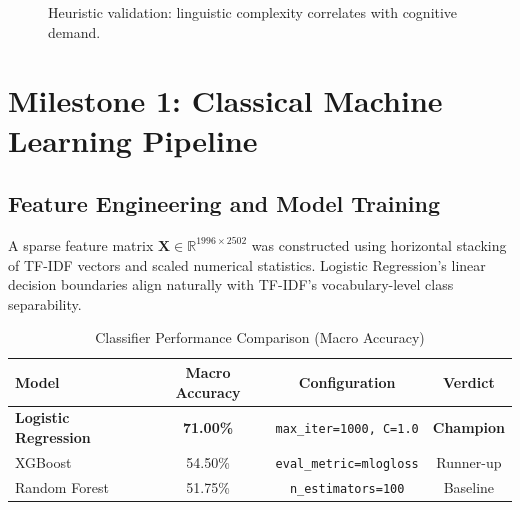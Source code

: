 \documentclass[12pt,a4paper]{article}
\begin{document}
\begin{figure}[H]
\centering
{}
\caption{Heuristic validation: linguistic complexity correlates with cognitive demand.}
\label{fig:wordcount}
\end{figure}

\section{Milestone 1: Classical Machine Learning Pipeline}

\subsection{Feature Engineering and Model Training}

A sparse feature matrix $\mathbf{X} \in \mathbb{R}^{1996 \times 2502}$ was constructed
using horizontal stacking of TF-IDF vectors and scaled numerical statistics. Logistic 
Regression's linear decision boundaries align naturally with TF-IDF's vocabulary-level 
class separability.

\begin{table}[H]
\centering
\caption{Classifier Performance Comparison (Macro Accuracy)}
\label{tab:models}
\begin{tabular}{lccc}
\toprule
\textbf{Model} & \textbf{Macro Accuracy} & \textbf{Configuration} & \textbf{Verdict} \\
\midrule
\textbf{Logistic Regression} & \textbf{71.00\%} & \texttt{max\_iter=1000, C=1.0} & \textbf{Champion} \\
XGBoost                      & 54.50\%          & \texttt{eval\_metric=mlogloss} & Runner-up        \\
Random Forest                & 51.75\%          & \texttt{n\_estimators=100}     & Baseline         \\
\bottomrule
\end{tabular}
\end{table}
\end{document}
